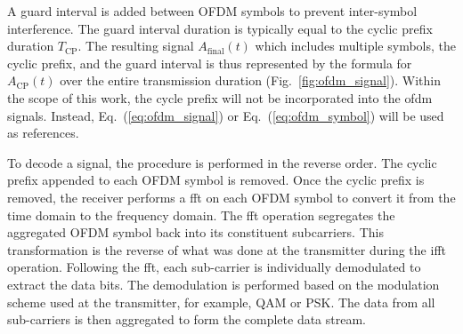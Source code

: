 A guard interval is added between OFDM symbols to prevent inter-symbol interference. The guard interval duration is typically equal to the cyclic prefix duration \( T_{\text{CP}} \).
The resulting signal \( A_{\text{final}}(t) \) which includes multiple symbols, the cyclic prefix, and the guard interval is thus represented by the formula for \( A_{\text{CP}}(t) \) over the entire transmission duration (Fig.~\ref{fig:ofdm_signal}). Within the scope of this work, the cycle prefix will not be incorporated into the \Gls{ofdm} signals. Instead, Eq.~(\ref{eq:ofdm_signal}) or Eq.~(\ref{eq:ofdm_symbol}) will be used as references.


To decode a signal, the procedure is performed in the reverse order.
The cyclic prefix appended to each OFDM symbol is removed. 
Once the cyclic prefix is removed, the receiver performs a \Gls{fft} on each OFDM symbol to convert it from the time domain to the frequency domain. The \Gls{fft} operation segregates the aggregated OFDM symbol back into its constituent subcarriers. This transformation is the reverse of what was done at the transmitter during the \Gls{ifft} operation. Following the \Gls{fft}, each sub-carrier is individually demodulated to extract the data bits. The demodulation is performed based on the modulation scheme used at the transmitter, for example, QAM or PSK. The data from all sub-carriers is then aggregated to form the complete data stream.